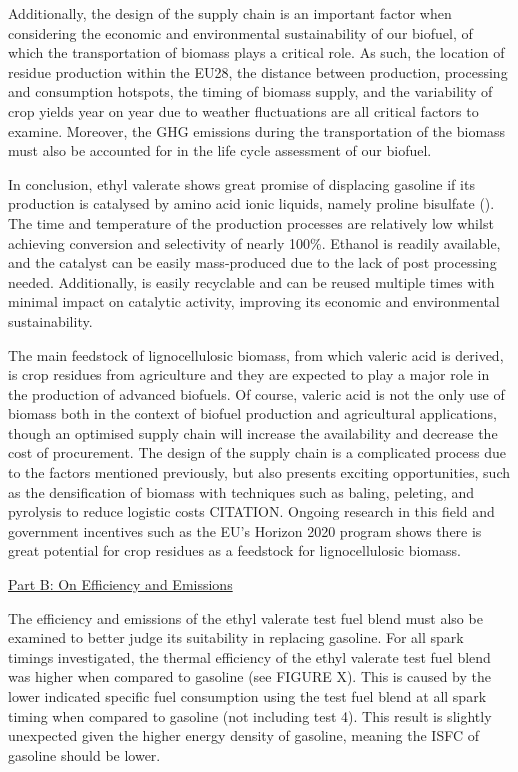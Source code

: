 \documentclass[11pt]{article}
\begin{document}
Additionally, the design of the supply chain is an important factor when considering the economic and environmental sustainability of our biofuel, of which the transportation of biomass plays a critical role. As such, the location of residue production within the EU28, the distance between production, processing and consumption hotspots, the timing of biomass supply, and the variability of crop yields year on year due to weather fluctuations are all critical factors to examine. Moreover, the GHG emissions during the transportation of the biomass must also be accounted for in the life cycle assessment of our biofuel.

In conclusion, ethyl valerate shows great promise of displacing gasoline if its production is catalysed by amino acid ionic liquids, namely proline bisulfate (). The time and temperature of the production processes are relatively low whilst achieving conversion and selectivity of nearly 100\%. Ethanol is readily available, and the catalyst can be easily mass-produced due to the lack of post processing needed. Additionally,  is easily recyclable and can be reused multiple times with minimal impact on catalytic activity, improving its economic and environmental sustainability.

The main feedstock of lignocellulosic biomass, from which valeric acid is derived, is crop residues from agriculture and they are expected to play a major role in the production of advanced biofuels. Of course, valeric acid is not the only use of biomass both in the context of biofuel production and agricultural applications, though an optimised supply chain will increase the availability and decrease the cost of procurement. The design of the supply chain is a complicated process due to the factors mentioned previously, but also presents exciting opportunities, such as the densification of biomass with techniques such as baling, peleting, and pyrolysis to reduce logistic costs CITATION. Ongoing research in this field and government incentives such as the EU’s Horizon 2020 program shows there is great potential for crop residues as a feedstock for lignocellulosic biomass.   

{\centering
  \underline{Part B: On Efficiency and Emissions}\par
}

The efficiency and emissions of the ethyl valerate test fuel blend must also be examined to better judge its suitability in replacing gasoline. For all spark timings investigated, the thermal efficiency of the ethyl valerate test fuel blend was higher when compared to gasoline (see FIGURE X). This is caused by the lower indicated specific fuel consumption using the test fuel blend at all spark timing when compared to gasoline (not including test 4). This result is slightly unexpected given the higher energy density of gasoline, meaning the ISFC of gasoline should be lower.
\end{document}
